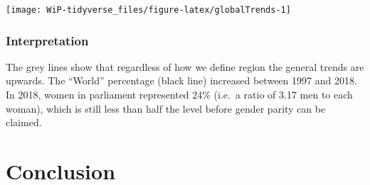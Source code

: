 \documentclass[a4paper,9pt,twocolumn,twoside,printwatermark=false]{pinp}
\begin{document}
\begin{Shaded}
\end{Shaded}

\begin{center}\texttt{[image: WiP-tidyverse\_files/figure-latex/globalTrends-1]} \end{center}

\subsubsection{Interpretation}\label{interpretation-5}

The grey lines show that regardless of how we define region the general
trends are upwards. The ``World'' percentage (black line) increased
between 1997 and 2018. In 2018, women in parliament represented 24\%
(i.e.~a ratio of 3.17 men to each woman), which is still less than half
the level before gender parity can be claimed.

\section{Conclusion}\label{conclusion}
\end{document}
